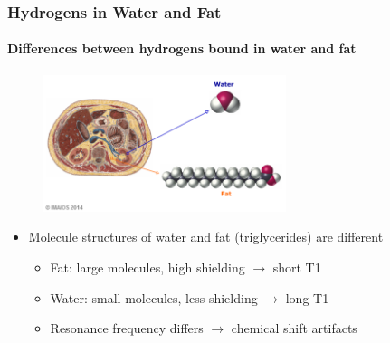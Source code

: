 
	
			
		
			
	
	

\begin{frame}
	\frametitle{Hydrogens in Water and Fat}
	\framesubtitle{Differences between hydrogens bound in water and fat}

\begin{figure}%
\includegraphics[height=4cm]{images/hydrogen_in_water_fat.png}%
\end{figure}
%
\begin{itemize}
		\item Molecule structures of water and fat (triglycerides) are different
			\begin{itemize}
			\item Fat: large molecules, high shielding $\rightarrow$ short T1
			\item Water: small molecules, less shielding $\rightarrow$ long T1
			\item Resonance frequency differs $\rightarrow$ chemical shift artifacts
			\end{itemize}
	\end{itemize}
\end{frame}

